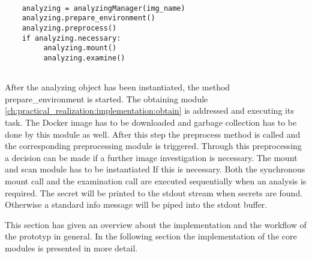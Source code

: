 \lstset{language=Python} 
\begin{lstlisting}[]
	
    analyzing = analyzingManager(img_name)
    analyzing.prepare_environment()
    analyzing.preprocess()
    if analyzing.necessary:
         analyzing.mount()
         analyzing.examine()
    
\end{lstlisting}
After the analyzing object has been instantiated, the method prepare\_environment is started. The obtaining module \ref{ch:practical_realization:implementation:obtain} is addressed and executing its task.
The Docker image has to be downloaded and garbage collection has to be done by this module as well. After this step the preprocess method is called and the corresponding preprocessing module is triggered.
Through this preprocessing a decision can be made if a further image investigation is necessary. The mount and scan module has to be instantiated If this is necessary. Both the synchronous mount call and the examination call are executed sequentially when an analysis is required.
The secret will be printed to the stdout stream when secrets are found. Otherwise a standard info message will be piped into the stdout buffer.

This section has given an overview about the implementation and the workflow of the prototyp in general. In the following section the implementation of the core modules is presented in more detail.

